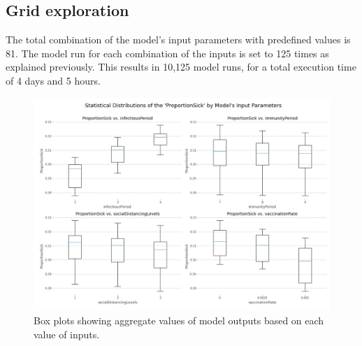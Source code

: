 \documentclass[smallextended]{svjour3}       %
\begin{document}
\subsection{Grid exploration}

The total combination of the model's input parameters with predefined values is 81. The model run for each combination of the inputs is set to 125 times as explained previously. This results in 10,125 model runs, for a total execution time of 4 days and 5 hours.





\begin{figure}
	\centering
	\includegraphics[width=\linewidth]{figures/boxplots.png}
	\caption{Box plots showing aggregate values of model outputs based on each value of inputs.\label{fig:boxplots}}
\end{figure}
\end{document}
